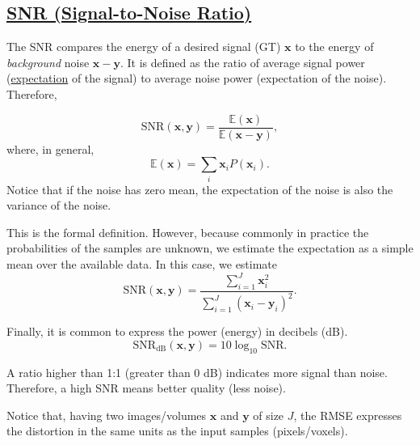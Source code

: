 \documentclass{article}
\begin{document}

\subsection{\href{https://en.wikipedia.org/wiki/Signal-to-noise_ratio}{SNR (Signal-to-Noise Ratio)}}

The SNR compares the energy of a desired signal (GT) $\mathbf{x}$ to
the energy of \emph{background} noise $\mathbf{x}-\mathbf{y}$. It is
defined as the ratio of average signal power
(\href{https://en.wikipedia.org/wiki/Expected_value}{expectation} of
the signal) to average noise power (expectation of the
noise). Therefore,

\begin{equation}
  \text{SNR}(\mathbf{x},\mathbf{y}) = \frac{\mathbb{E}(\mathbf{x})}{\mathbb{E}(\mathbf{x} - \mathbf{y})},
  \label{eq:formal_SNR}
\end{equation}
where, in general, 
\begin{equation}
  \mathbb{E}(\mathbf{x}) = \sum_{i}\mathbf{x}_iP(\mathbf{x}_i).
  \label{eq:expectation}
\end{equation}
Notice that if the noise has zero mean, the expectation
of the noise is also the variance of the noise.

This is the formal definition. However, because commonly in
practice the probabilities of the samples are unknown, we estimate the
expectation as a simple mean over the available data. In this case,
we estimate
\begin{equation}
  \text{SNR}(\mathbf{x},\mathbf{y}) = \frac{\sum_{i=1}^J\mathbf{x}_i^2}{\sum_{i=1}^J(\mathbf{x}_i - \mathbf{y}_i)^2}.
  \label{eq:estimated_SNR}
\end{equation}

Finally, it is common to express the power (energy) in decibels (dB).
\begin{equation}
  \text{SNR}_{\text{dB}}(\mathbf{x},\mathbf{y}) = 10\log_{10}\text{SNR}.
  \label{eq:estimated_SNR_in_dBs}
\end{equation}

A ratio higher than 1:1 (greater than 0 dB) indicates more signal than
noise. Therefore, a high SNR means better quality (less noise).

Notice that, having two images/volumes $\mathbf{x}$ and $\mathbf{y}$
of size $J$, the RMSE expresses the distortion in the same units as
the input samples (pixels/voxels).

\end{document}
